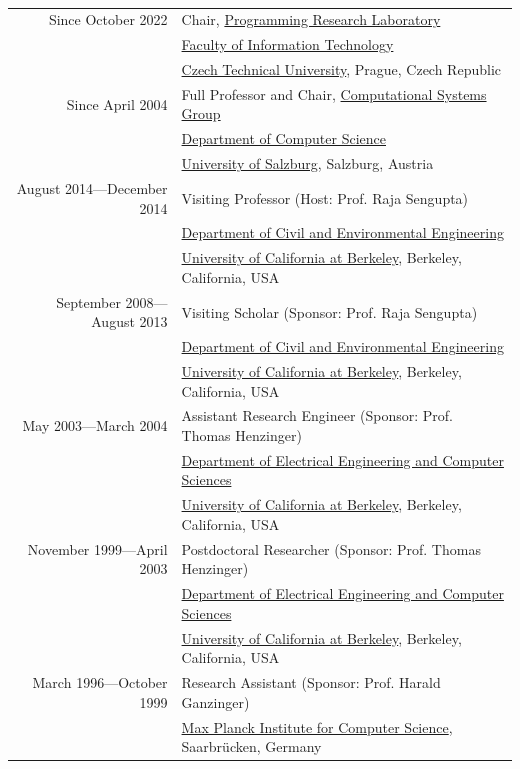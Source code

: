  \\
\begin{tabular}{rl}
Since October 2022 & Chair, \href{https://prl-prg.github.io}{Programming Research Laboratory} \\
                 & \href{https://fit.cvut.cz}{Faculty of Information Technology} \\
                 & \href{https://cvut.cz}{Czech Technical University}, Prague, Czech Republic \\
\noalign{\smallskip}
Since April 2004 & Full Professor and Chair, \href{https://www.cs.uni-salzburg.at/~ck}{Computational Systems Group} \\
                 & \href{https://informatik.uni-salzburg.at}{Department of Computer Science} \\
                 & \href{https://plus.ac.at}{University of Salzburg}, Salzburg, Austria \\
\noalign{\smallskip}
August 2014---December 2014 & Visiting Professor (Host: Prof. Raja Sengupta)\\
                            & \href{http://www.ce.berkeley.edu}{Department of Civil and Environmental Engineering} \\
                            & \href{http://www.berkeley.edu}{University of California at Berkeley}, Berkeley, California, USA \\
\noalign{\smallskip}
September 2008---August 2013 & Visiting Scholar (Sponsor: Prof. Raja Sengupta)\\
                             & \href{http://www.ce.berkeley.edu}{Department of Civil and Environmental Engineering} \\
                             & \href{http://www.berkeley.edu}{University of California at Berkeley}, Berkeley, California, USA \\
\noalign{\smallskip}
May 2003---March 2004 & Assistant Research Engineer (Sponsor: Prof. Thomas Henzinger)\\
                      & \href{http://www.eecs.berkeley.edu}{Department of Electrical Engineering and Computer Sciences} \\
                      & \href{http://www.berkeley.edu}{University of California at Berkeley}, Berkeley, California, USA \\
\noalign{\smallskip}
November 1999---April 2003 & Postdoctoral Researcher (Sponsor: Prof. Thomas Henzinger)\\
                           & \href{http://www.eecs.berkeley.edu}{Department of Electrical Engineering and Computer Sciences} \\
                           & \href{http://www.berkeley.edu}{University of California at Berkeley}, Berkeley, California, USA \\
\noalign{\smallskip}
March 1996---October 1999 & Research Assistant (Sponsor: Prof. Harald Ganzinger)\\
                          & \href{http://www.mpi-sb.mpg.de}{Max Planck Institute for Computer Science}, Saarbr{\"u}cken, Germany \\
\end{tabular}

\newpage
